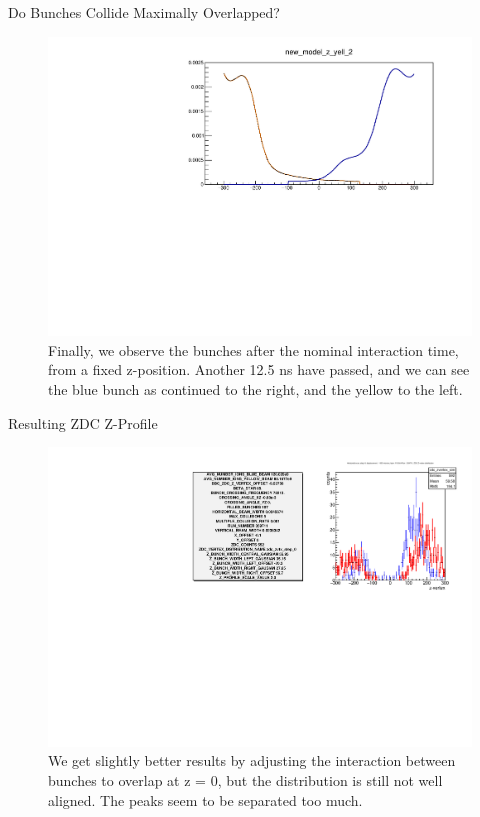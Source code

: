 \begin{frame}{Do Bunches Collide Maximally Overlapped?}
\begin{figure}
\begin{center}
\includegraphics[width=0.8\linewidth]{../ExploringZProfile/figs/359711_time_step_2_bunch_collision.pdf}
\end{center}
\caption{Finally, we observe the bunches after the nominal interaction time,
from a fixed z-position. Another 12.5 ns have passed, and we can see the blue
bunch as continued to the right, and the yellow to the left.}
\label{fig:359711_time_step_2_bunch_collision}
\end{figure}
\end{frame}

\begin{frame}{Resulting ZDC Z-Profile}
\begin{figure}
\begin{center}
\includegraphics[width=0.8\linewidth]{../ExploringZProfile/figs/359711_step_0_zvertex_compare.pdf}
\end{center}
\caption{We get slightly better results by adjusting the interaction between
bunches to overlap at z = 0, but the distribution is still not well aligned. The
peaks seem to be separated too much.}
\label{fig:359711_step_0_zvertex_compare}
\end{figure}
\end{frame}

